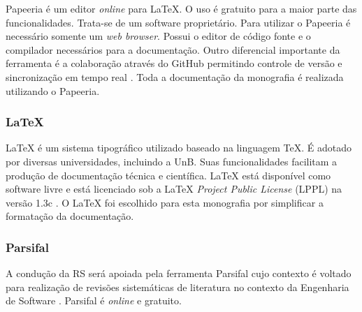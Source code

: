 Papeeria é um editor \textit{online} para LaTeX. O uso é gratuito para a maior parte das funcionalidades. Trata-se de um software proprietário. Para utilizar o Papeeria é necessário somente um \textit{web browser}. Possui o editor de código fonte e o compilador necessários para a documentação. Outro diferencial importante da ferramenta é a colaboração através do GitHub permitindo controle de versão e sincronização em tempo real \cite{papeeria2016}. Toda a documentação da monografia é realizada utilizando o Papeeria.

\subsubsection{LaTeX}
LaTeX é um sistema tipográfico utilizado baseado na linguagem TeX. É adotado por diversas universidades, incluindo a UnB. Suas funcionalidades facilitam a produção de documentação técnica e científica. LaTeX está disponível como software livre e está licenciado sob a LaTeX \textit{Project Public License} (LPPL) na versão 1.3c \cite{latex2016}. O LaTeX foi escolhido para esta monografia por simplificar a formatação da documentação.

\subsubsection{Parsifal}
A condução da RS será apoiada pela ferramenta Parsifal cujo contexto é voltado para realização de revisões sistemáticas de literatura no contexto da Engenharia de Software \cite{parsifal2016}. Parsifal é \textit{online} e gratuito.


